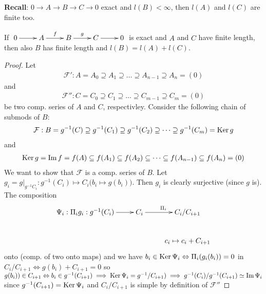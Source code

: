 \noindent\textbf{Recall}: \(0\rightarrow A \rightarrow B \rightarrow C \rightarrow 0\) exact and \(l(B) < \infty\), then \(l(A)\) and \(l(C)\) are finite too.
\begin{prop}\label{prop:12}
If \(\xymatrix{0\ar[r] & A\ar[r]^f & B\ar[r]^g & C\ar[r] & 0}\) is exact and \(A\) and \(C\) have finite length, then also \(B\) has finite length and \(l(B) = l(A) + l(C)\).
\end{prop}
\begin{proof}
Let 
\begin{align*}
    \mathcal{F}': A = A_0 \supseteq A_1 \supseteq\dots\supseteq A_{n-1}\supseteq A_n = (0)
\end{align*}
and
\begin{align*}
    \mathcal{F}'': C = C_0 \supseteq C_1 \supseteq\dots\supseteq C_{m-1}\supseteq C_m = (0)
\end{align*}
be two comp. series of \(A\) and \(C\), respectivley. Consider the following chain of submods of \(B\):\\[0.2cm]
\begin{align*}
    \mathcal{F}: B = g^{-1}(C) \supseteq g^{-1}(C_1) \supseteq g^{-1}(C_2) \supseteq\dots\supseteq g^{-1}(C_m) = \operatorname{Ker}\nolimits g
\end{align*}
and
\begin{align}
    \operatorname{Ker}\nolimits g = \operatorname{Im}\nolimits f = f(A) \subseteq f(A_1) \subseteq f(A_2) \subseteq\dots\subseteq f(A_{n-1}) \subseteq f(A_n) = (0)
\end{align}
We want to show that \(\mathcal{F}\) is a comp. series of \(B\). Let \(g_i = g|_{g^{-1}C_i}: g^{-1}(C_i)\mapsto C_i \big(b_i\mapsto g(b_i)\big)\). Then \(g_i\) is clearly surjective (since \(g\) is). The composition
\begin{align*}
\xymatrix{\Psi_i:\Pi_i g_i: g^{-1}(C_i)\ar[r] & C_i\ar[r]^{\Pi_i} & C_i/C_{i+1}  \\
 & & c_i \mapsto c_i + C_{i+1}}
\end{align*} 
 onto (comp. of two onto maps) and we have \(b_i\in \operatorname{Ker}\nolimits \Psi_i \Leftrightarrow \Pi_i(g_i(b_i)) = 0\) in \(C_i/C_{i+1} \Leftrightarrow g(b_i) + C_{i+1} = 0\) so \(g(b_i))\in C_{i+1} \Leftrightarrow b_i\in g^{-1}(C_{i+1})\implies \operatorname{Ker}\nolimits\Psi_i = g^{-1}/C_{i+1})\implies g^{-1}(C_i)/g^{-1}(C_{i+1}) \simeq \operatorname{Im}\nolimits \Psi_i\) since \(g^{-1}(C_{i+1}) = \operatorname{Ker}\nolimits \Psi_i\) and \(C_i/C_{i+1}\) is simple by definition of \(\mathcal{F}''\)
 \end{proof}


